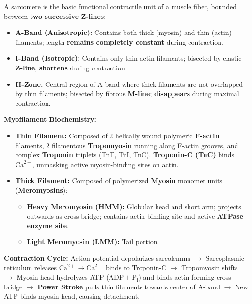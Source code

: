 \documentclass[10pt,a4paper]{article}
\begin{document}
\begin{conceptbox}
A sarcomere is the basic functional contractile unit of a muscle fiber, bounded between \textbf{two successive Z-lines}:
\begin{itemize}
  \item \textbf{A-Band (Anisotropic):} Contains both thick (myosin) and thin (actin) filaments; length \textbf{remains completely constant} during contraction.
  \item \textbf{I-Band (Isotropic):} Contains only thin actin filaments; bisected by elastic \textbf{Z-line}; \textbf{shortens} during contraction.
  \item \textbf{H-Zone:} Central region of A-band where thick filaments are not overlapped by thin filaments; bisected by fibrous \textbf{M-line}; \textbf{disappears} during maximal contraction.
\end{itemize}
\textbf{Myofilament Biochemistry:}
\begin{itemize}
  \item \textbf{Thin Filament:} Composed of 2 helically wound polymeric \textbf{F-actin} filaments, 2 filamentous \textbf{Tropomyosin} running along F-actin grooves, and complex \textbf{Troponin} triplets (TnT, TnI, TnC). \textbf{Troponin-C (TnC)} binds $\mathrm{Ca}^{2+}$, unmasking active myosin-binding sites on actin.
  \item \textbf{Thick Filament:} Composed of polymerized \textbf{Myosin} monomer units (\textbf{Meromyosins}):
  \begin{itemize}
    \item \textbf{Heavy Meromyosin (HMM):} Globular head and short arm; projects outwards as cross-bridge; contains actin-binding site and active \textbf{ATPase enzyme site}.
    \item \textbf{Light Meromyosin (LMM):} Tail portion.
  \end{itemize}
\end{itemize}
\textbf{Contraction Cycle:} Action potential depolarizes sarcolemma $\to$ Sarcoplasmic reticulum releases $\mathrm{Ca}^{2+} \to \mathrm{Ca}^{2+}$ binds to Troponin-C $\to$ Tropomyosin shifts $\to$ Myosin head hydrolyzes ATP ($\mathrm{ADP} + \mathrm{P_i}$) and binds actin forming cross-bridge $\to$ \textbf{Power Stroke} pulls thin filaments towards center of A-band $\to$ New ATP binds myosin head, causing detachment.
\end{conceptbox}
\end{document}
